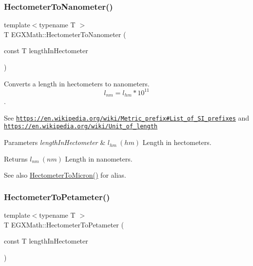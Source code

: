 \subsubsection{\texorpdfstring{Hectometer\+To\+Nanometer()}{HectometerToNanometer()}}
{\footnotesize\ttfamily template$<$typename T $>$ \\
T E\+G\+X\+Math\+::\+Hectometer\+To\+Nanometer (\begin{DoxyParamCaption}\item[{const T}]{length\+In\+Hectometer }\end{DoxyParamCaption})}



Converts a length in hectometers to nanometers. \[ l_{nm}=l_{hm} * 10^{11} \]. 

See \href{https://en.wikipedia.org/wiki/Metric_prefix#List_of_SI_prefixes}{\tt https\+://en.\+wikipedia.\+org/wiki/\+Metric\+\_\+prefix\#\+List\+\_\+of\+\_\+\+S\+I\+\_\+prefixes} and \href{https://en.wikipedia.org/wiki/Unit_of_length}{\tt https\+://en.\+wikipedia.\+org/wiki/\+Unit\+\_\+of\+\_\+length} 
\begin{DoxyParams}{Parameters}
{\em length\+In\+Hectometer} & $ l_{hm}\ (hm)$ Length in hectometers. \\
\hline
\end{DoxyParams}
\begin{DoxyReturn}{Returns}
$ l_{nm}\ (nm)$ Length in nanometers. 
\end{DoxyReturn}
\begin{DoxySeeAlso}{See also}
\mbox{\hyperlink{group___e_g_x_math-_conversions-_length_conversions-_hectometer-_non-_s_i_ga997feaaeb91fc61c1d87c5d77fb7a665}{Hectometer\+To\+Micron()}} for alias. 
\end{DoxySeeAlso}
\mbox{\label{group___e_g_x_math-_conversions-_length_conversions-_hectometer-_s_i_ga212c05cda0b3776419e97ae7b3e0158a}} 
\subsubsection{\texorpdfstring{Hectometer\+To\+Petameter()}{HectometerToPetameter()}}
{\footnotesize\ttfamily template$<$typename T $>$ \\
T E\+G\+X\+Math\+::\+Hectometer\+To\+Petameter (\begin{DoxyParamCaption}\item[{const T}]{length\+In\+Hectometer }\end{DoxyParamCaption})}



